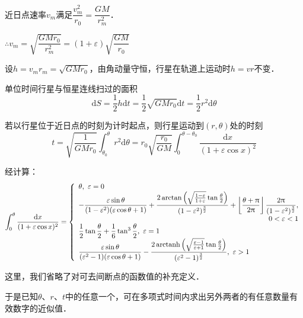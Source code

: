\documentclass[UTF8,fontset=none,linespread=1.2]{ctexart}
\DeclareMathOperator{\arctanh}{arctanh}
\newcommand{\upd}{\mathrm{d}}
\begin{document}
近日点速率$v_m$满足$\dfrac{v_m^2}{r_0}=\dfrac{GM}{r_m^2}$．

$\therefore v_m=\sqrt{\dfrac{GMr_0}{r_m^2}}=(1+\varepsilon)\sqrt{\dfrac{GM}{r_0}}$

设$h=v_mr_m=\sqrt{GMr_0}$，由角动量守恒，行星在轨道上运动时$h=vr$不变．

单位时间行星与恒星连线扫过的面积$$\upd S=\dfrac12h\upd t=\dfrac12\sqrt{GMr_0}\upd t=\dfrac12r^2\upd\theta$$

若以行星位于近日点的时刻为计时起点，则行星运动到$(r,\theta)$处的时刻$$t=\sqrt{\dfrac{1}{GMr_0}}\int_{\theta_0}^{\theta}r^2\upd \theta=r_0\sqrt{\dfrac{r_0}{GM}}\int_0^{\theta-\theta_0}\dfrac{\upd x}{(1+\varepsilon\cos x)^2}$$

经计算：$$\int_0^{\theta}\dfrac{\upd x}{(1+\varepsilon\cos x)^2}=\left\lbrace\begin{array}{l}
\theta,\ \varepsilon=0\\
-\dfrac{\varepsilon\sin\theta}{(1-\varepsilon^2)(\varepsilon\cos\theta+1)}+\dfrac{2\arctan\left(\sqrt{\frac{1-\varepsilon}{1+\varepsilon}}\tan\frac\theta2\right)}{(1-\varepsilon^2)^{\frac32}}+\left\lfloor\dfrac{\theta+\uppi}{2\uppi}\right\rfloor\dfrac{2\uppi}{(1-\varepsilon^2)^{\frac32}},\\
\hspace*{\fill} 0<\varepsilon<1\\
\dfrac12\tan\dfrac\theta2+\dfrac16\tan^3\dfrac\theta2,\ \varepsilon=1\\
\dfrac{\varepsilon\sin\theta}{(\varepsilon^2-1)(\varepsilon\cos\theta+1)}-\dfrac{2\arctanh\left(\sqrt{\frac{\varepsilon-1}{\varepsilon+1}}\tan\frac\theta2\right)}{(\varepsilon^2-1)^{\frac32}},\ \varepsilon>1\\
\end{array}\right.$$

这里，我们省略了对可去间断点的函数值的补充定义．

于是已知$\theta$、$r$、$t$中的任意一个，可在多项式时间内求出另外两者的有任意数量有效数字的近似值．
\end{document}
